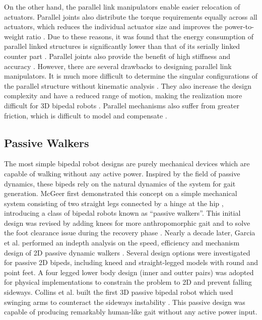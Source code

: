 On the other hand, the parallel link manipulators \cite{Merlet2006} enable easier relocation of actuators. Parallel joints also distribute the torque requirements equally across all actuators, which reduces the individual actuator size and improves the power-to-weight ratio \cite{Konno2002}. Due to these reasons, it was found that the energy consumption of parallel linked structures is significantly lower than that of its serially linked counter part \cite{Morisawa2000}. Parallel joints also provide the benefit of high stiffness and accuracy \cite{Sellaouti2005}. However, there are several drawbacks to designing parallel link manipulators. It is much more difficult to determine the singular configurations of the parallel structure without kinematic analysis \cite{Sellaouti2005}. They also increase the design complexity and have a reduced range of motion, making the realization more difficult for 3D bipedal robots \cite{Lohmeier2006}. Parallel mechanisms also suffer from greater friction, which is difficult to model and compensate \cite{Yiu2001,Shang2008}.



\subsection{Passive Walkers} %
\label{sub:related_passive_designs}
The most simple bipedal robot designs are purely mechanical devices which are capable of walking without any active power. Inspired by the field of passive dynamics, these bipeds rely on the natural dynamics of the system for gait generation. McGeer first demonstrated this concept on a simple mechanical system consisting of two straight legs connected by a hinge at the hip \cite{McGeer:1990uk}, introducing a class of bipedal robots known as ``passive walkers''. This initial design was revised by adding knees for more anthropomorphic gait and to solve the foot clearance issue during the recovery phase \cite{McGeer:1990hh}. Nearly a decade later, Garcia et al. performed an indepth analysis on the speed, efficiency and mechanism design of 2D passive dynamic walkers \cite{Garcia:2000kv}. Several design options were investigated for passive 2D bipeds, including kneed and straight-legged models with round and point feet. A four legged lower body design (inner and outter pairs) was adopted for physical implementations to constrain the problem to 2D and prevent falling sideways. Collins et al. built the first 3D passive bipedal robot which used swinging arms to counteract the sideways instability \cite{Collins:2001jq}. This passive design was capable of producing remarkably human-like gait without any active power input. 


